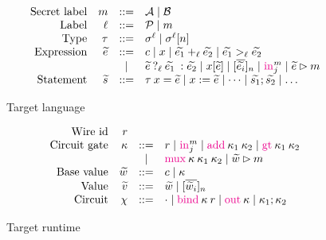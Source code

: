 \newcommand{\lcond}[4]{\ensuremath{{{#2}\:?_{{#1}}\:{#3}\::{#4}}}}

\begin{figure}
  \[
  \begin{array}{rrcl}
    \ftext{Secret label} & m &::=& \mathcal{A} \mid \mathcal{B}\\
    \ftext{Label} & \ell &::=& \mathcal{P} \mid m\\
    \ftext{Type} & \tau &::=& \sigma^{\ell} \mid \sigma^{\ell}[n]\\
    \ftext{Expression} & \widetilde{e} &::=& c \mid x \mid \widetilde{e_{1}} +_{\ell} \widetilde{e_{2}} \mid \widetilde{e_{1}} >_{\ell} \widetilde{e_{2}} \\
    & & \mid & \lcond{\ell}{{\widetilde{e}}}{{\widetilde{e_{1}}}}{{\widetilde{e_{2}}}} \mid x[\widetilde{e}] \mid [\overline{\widetilde{e_{i}}}]_{n} \mid \kw{in}^{m}_{j} \mid \widetilde{e} \rhd m\\
    \ftext{Statement} & \widetilde{s} &::=& \tau\:x = \widetilde{e} \mid x := \widetilde{e} \mid \dots \mid \widetilde{s_{1}}; \widetilde{s_{2}} \mid \dots\\
  \end{array}
  \]
\label{fig:tgtlang}
\caption{Target language}
\end{figure}

\begin{figure}
  \[
  \begin{array}{rrcl}
    \ftext{Wire id} & r &&\\
    \ftext{Circuit gate} & \kappa & ::= & r \mid \kw{in}^{m}_{j} \mid \kw{add}\:\kappa_{1}\:\kappa_{2} \mid \kw{gt}\:\kappa_{1}\:\kappa_{2}\\
    & & \mid & \kw{mux}\:\kappa\:\kappa_{1}\:\kappa_{2} \mid \widetilde{w} \rhd m\\
    \ftext{Base value} & \widetilde{w} & ::= & c \mid \kappa\\
    \ftext{Value} & \widetilde{v} & ::= & \widetilde{w} \mid [\overline{\widetilde{w}_{i}}]_{n}\\
    \ftext{Circuit} & \chi & ::= & \cdot \mid \kw{bind}\:\kappa\:r \mid \kw{out}\:\kappa \mid \kappa_{1}; \kappa_{2}
  \end{array}
  \]
\label{fig:tgtruntime}
\caption{Target runtime}
\end{figure}


